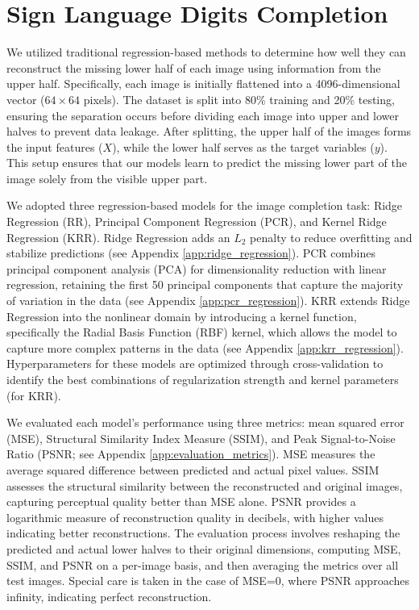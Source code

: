 \documentclass{article}
\begin{document}
\section{Sign Language Digits Completion}
We utilized traditional regression-based methods to determine how well they can reconstruct the missing lower half of each image using information from the upper half. Specifically, each image is initially flattened into a 4096-dimensional vector ($64 \times 64$ pixels). The dataset is split into 80\% training and 20\% testing, ensuring the separation occurs before dividing each image into upper and lower halves to prevent data leakage. After splitting, the upper half of the images forms the input features ($X$), while the lower half serves as the target variables ($y$). This setup ensures that our models learn to predict the missing lower part of the image solely from the visible upper part.

We adopted three regression-based models for the image completion task: Ridge Regression (RR), Principal Component Regression (PCR), and Kernel Ridge Regression (KRR). Ridge Regression adds an $L_2$ penalty to reduce overfitting and stabilize predictions (see Appendix \ref{app:ridge_regression}). PCR combines principal component analysis (PCA) for dimensionality reduction with linear regression, retaining the first 50 principal components that capture the majority of variation in the data (see Appendix \ref{app:pcr_regression}). KRR extends Ridge Regression into the nonlinear domain by introducing a kernel function, specifically the Radial Basis Function (RBF) kernel, which allows the model to capture more complex patterns in the data (see Appendix \ref{app:krr_regression}). Hyperparameters for these models are optimized through cross-validation to identify the best combinations of regularization strength and kernel parameters (for KRR).

We evaluated each model’s performance using three metrics: mean squared error (MSE), Structural Similarity Index Measure (SSIM), and Peak Signal-to-Noise Ratio (PSNR; see Appendix \ref{app:evaluation_metrics}). MSE measures the average squared difference between predicted and actual pixel values. SSIM assesses the structural similarity between the reconstructed and original images, capturing perceptual quality better than MSE alone. PSNR provides a logarithmic measure of reconstruction quality in decibels, with higher values indicating better reconstructions. The evaluation process involves reshaping the predicted and actual lower halves to their original dimensions, computing MSE, SSIM, and PSNR on a per-image basis, and then averaging the metrics over all test images. Special care is taken in the case of MSE=0, where PSNR approaches infinity, indicating perfect reconstruction.
\end{document}
